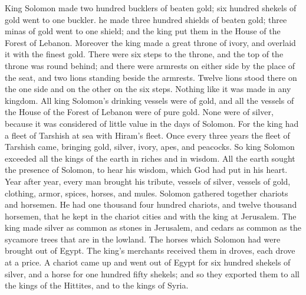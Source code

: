 {King Solomon made two hundred bucklers of beaten gold; six hundred shekels of gold went to one buckler.
he made three hundred shields of beaten gold; three minas of gold went to one shield; and the king put them in the House of the Forest of Lebanon.
Moreover the king made a great throne of ivory, and overlaid it with the finest gold.
There were six steps to the throne, and the top of the throne was round behind; and there were armrests on either side by the place of the seat, and two lions standing beside the armrests.
Twelve lions stood there on the one side and on the other on the six steps. Nothing like it was made in any kingdom.
All king Solomon’s drinking vessels were of gold, and all the vessels of the House of the Forest of Lebanon were of pure gold. None were of silver, because it was considered of little value in the days of Solomon.
For the king had a fleet of Tarshish at sea with Hiram’s fleet. Once every three years the fleet of Tarshish came, bringing gold, silver, ivory, apes, and peacocks.
So king Solomon exceeded all the kings of the earth in riches and in wisdom.
All the earth sought the presence of Solomon, to hear his wisdom, which God had put in his heart.
Year after year, every man brought his tribute, vessels of silver, vessels of gold, clothing, armor, spices, horses, and mules.
Solomon gathered together chariots and horsemen. He had one thousand four hundred chariots, and twelve thousand horsemen, that he kept in the chariot cities and with the king at Jerusalem.
The king made silver as common as stones in Jerusalem, and cedars as common as the sycamore trees that are in the lowland.
The horses which Solomon had were brought out of Egypt. The king’s merchants received them in droves, each drove at a price.
A chariot came up and went out of Egypt for six hundred shekels of silver, and a horse for one hundred fifty shekels; and so they exported them to all the kings of the Hittites, and to the kings of Syria.

}

